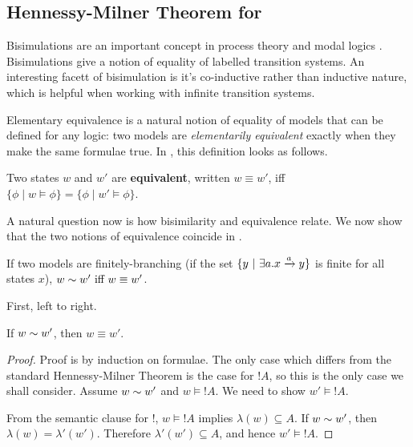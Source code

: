 \subsection{Hennessy-Milner Theorem for \ELABR{}}

Bisimulations are an important concept in process theory and modal
logics \cite{SangiorgiD:intbisac}. Bisimulations give a notion of
equality of labelled transition systems. An interesting facett of
bisimulation is it's co-inductive rather than inductive nature, which
is helpful when working with infinite transition systems.

Elementary equivalence is a natural notion of equality of models that
can be defined for any logic: two models are \emph{elementarily
  equivalent} exactly when they make the same formulae true. In
\ELABR{}, this definition looks as follows.

\begin{definition}
Two states $w$ and $w'$ are {\bf equivalent}, written $w \equiv w'$,
iff $\{\phi \; | \; w \models \phi\} = \{\phi \; | \; w' \models
\phi\}$.
\end{definition}

\NI A natural question now is how bisimilarity and equivalence
relate. We now show that the two notions of equivalence coincide in
\ELFULL{}.

\begin{theorem}
\label{hennessymilnertheorem}
If two models are finitely-branching (if the set $\{y \ | \  \exists a
. x \xrightarrow{a} y\}$ is finite for all states $x$), $w \sim w'
\mbox{ iff } w \equiv w' $.
\end{theorem}
First, left to right.
\begin{case}
If $w \sim w'$, then $w \equiv w'$.
\end{case}
\begin{proof}
Proof is by induction on formulae.  The only case which differs from
the standard Hennessy-Milner Theorem is the case for $!A$, so this is
the only case we shall consider.  Assume $w \sim w'$ and $w \models
!A$. We need to show $w' \models !A$.

From the semantic clause for $!$,  $w \models !A$ implies $\lambda(w) \subseteq A$.
If $w \sim w'$, then $\lambda(w) = \lambda'(w')$.
Therefore $\lambda'(w') \subseteq A$, and hence $w' \models !A$.

\end{proof}

